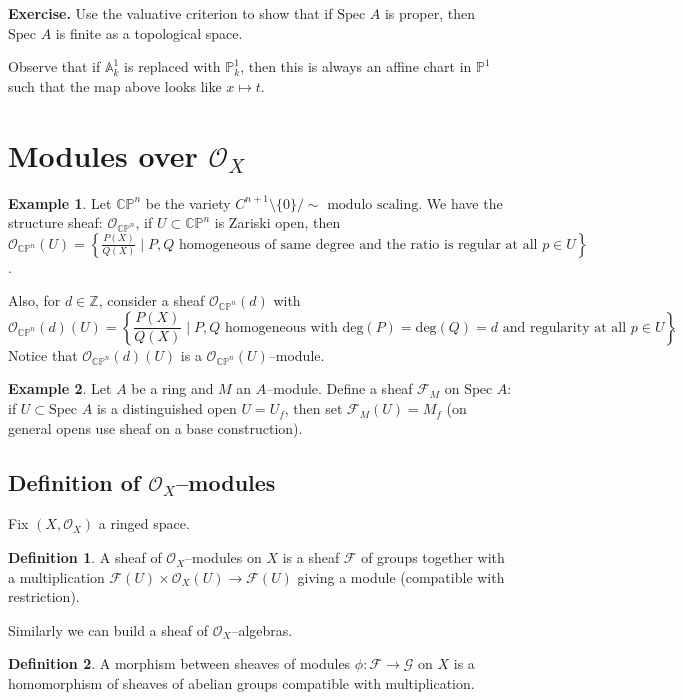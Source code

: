 \documentclass{article}
\theoremstyle{definition}
\newtheorem{example}{Example}[section]
\newtheorem{defn}{Definition}[section]
\begin{document}
\textbf{Exercise.} Use the valuative criterion to show that if $\text{Spec }A$ is proper, then $\text{Spec }A$ is finite as a topological space.
\vspace{1mm}
 
Observe that if $\mathbb{A}^1_k$ is replaced with $\mathbb{P}^1_k$, then this is always an affine chart in $\mathbb{P}^1$ such that the map above looks like $x \mapsto t$. 

\section{Modules over $\mathcal{O}_X$}
\begin{example}
    Let $\mathbb{C} \mathbb{P}^n$ be the variety $C^{n+1}\setminus \{0\}/\sim \text{ modulo scaling}$. We have the structure sheaf: $\mathcal{O}_{\mathbb{C} \mathbb{P}^n}$, if $U \subset \mathbb{C} \mathbb{P}^n$ is Zariski open, then $\mathcal{O}_{\mathbb{C} \mathbb{P}^n}(U) = \left\{\frac{P(X)}{Q(X)} \mid P,Q \text{ homogeneous of same degree and the ratio is regular at all }p \in U\right\}$.
    \vspace{1mm}
     
    Also, for $d \in \mathbb{Z}$, consider a sheaf $\mathcal{O}_{\mathbb{C} \mathbb{P}^n}(d)$ with $$\mathcal{O}_{\mathbb{C} \mathbb{P}^n}(d)(U) = \left\{\frac{P(X)}{Q(X)} \mid P,Q \text{ homogeneous with deg}(P) = \text{deg}(Q) =d  \text{ and regularity at all }p \in U\right\}.$$
    Notice that $\mathcal{O}_{\mathbb{C} \mathbb{P}^n}(d)(U)$ is a $\mathcal{O}_{\mathbb{C} \mathbb{P}^n}(U)$--module.
\end{example}
\begin{example}
    Let $A$ be a ring and $M$ an $A$--module. Define a sheaf $\mathcal{F}_M$ on $\text{Spec }A$: if $U \subset \text{Spec }A$ is a distinguished open $U= U_{f}$, then set $\mathcal{F}_M(U)=M_f$ (on general opens use sheaf on a base construction).
\end{example}

\subsection{Definition of $\mathcal{O}_X$--modules}
Fix $(X, \mathcal{O}_X)$ a ringed space.
\begin{defn}
    A sheaf of $\mathcal{O}_X$--modules on $X$ is a sheaf $\mathcal{F}$ of groups together with a multiplication $\mathcal{F}(U) \times \mathcal{O}_X(U) \to \mathcal{F}(U)$ giving a module (compatible with restriction).
\end{defn}
Similarly we can build a sheaf of $\mathcal{O}_X$--algebras.

\begin{defn}
    A morphism between sheaves of modules $\phi : \mathcal{F} \to \mathcal{G}$ on $X$ is a homomorphism of sheaves of abelian groups compatible with multiplication.
\end{defn}
\end{document}
